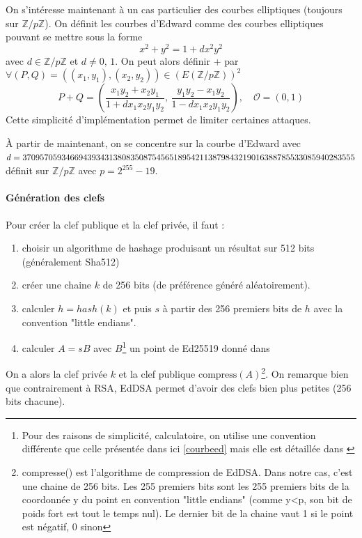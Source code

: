 \documentclass[a4paper, 12pt]{article}
\begin{document}
On s'intéresse maintenant à un cas particulier des courbes elliptiques (toujours sur $ \mathbb{Z}/p\mathbb{Z}$). On définit les courbes d'Edward comme des courbes elliptiques pouvant se mettre sous la forme 
$$
x^2 + y^2 = 1 + dx^2y^2
$$
avec $d \in \mathbb{Z}/p\mathbb{Z}$ et $d \neq 0,\, 1$. On peut alors définir + par
$
\forall (P,Q) = ((x_1,y_1),(x_2,y_2)) \in \left(E\left( \mathbb{Z}/p\mathbb{Z} \right)\right)^2
$
$$
P + Q = \left(\frac{x_1y_2+x_2y_1}{1+dx_1x_2y_1y_2},\, \frac{y_1y_2-x_1y_2}{1-dx_1x_2y_1y_2}\right), \quad \mathcal{O} = \left(0,1\right) 
$$
Cette simplicité d'implémentation permet de limiter certaines attaques. 

À partir de maintenant, on se concentre sur la courbe d'Edward avec $d = 3709570\\59346694393431380835087545651895421138798432190163887855330859402\\83555$ définit sur $ \mathbb{Z}/p\mathbb{Z}$ avec $p = 2^{255}-19$.


\paragraph{Génération des clefs}
\noindent Pour créer la clef publique et la clef privée, il faut :
\begin{enumerate}
	\item choisir un algorithme de hashage produisant un résultat sur 512 bits (généralement Sha512)
	\item créer une chaine $k$ de 256 bits (de préférence généré aléatoirement).
	\item calculer $h = hash(k)$ et puis $s$ à partir des 256 premiers bits de $h$ avec la convention "little endians".
	\item calculer $A = sB$ avec $B$\footnote{Pour des raisons de simplicité, calculatoire, on utilise une convention différente que celle présentée dans ici \ref{courbeed} mais elle est détaillée dans \cite{eddsa}} un point de Ed25519 donné dans \cite{eddsa}\\
\end{enumerate}

On a alors la clef privée $k$ et la clef publique $\text{compress}(A)$\footnote{compresse() est l'algorithme de compression de EdDSA. Dans notre cas, c'est une chaine de 256 bits. Les 255 premiers bits sont les 255 premiers bits de la coordonnée y du point en convention "little endians" (comme y<p, son bit de poids fort est tout le temps nul). Le dernier bit de la chaine vaut 1 si le point est négatif, 0 sinon}. On remarque bien que contrairement à RSA, EdDSA permet d'avoir des clefs bien plus petites (256 bits chacune).
\end{document}
